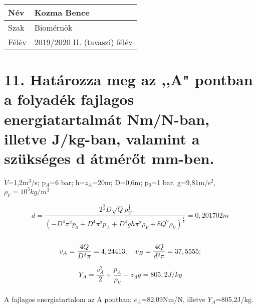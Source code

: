 \begin{tabular}{ | p{2cm} | p{14cm} | } 
	\hline
	Név & Kozma Bence \\ 
	\hline
	Szak & Biomérnök \\ 
	\hline
	Félév & 2019/2020 II. (tavaszi) félév \\ 
	\hline
\end{tabular}
\section*{11. Határozza meg az ,,A" pontban a folyadék fajlagos energiatartalmát Nm/N-ban, illetve J/kg-ban, valamint a szükséges d átmérőt mm-ben.} 
$\dot{V}$=1,2m$^3$/s; p$_A$=6 bar; h=$z_A$=20m; D=0,6m; p$_0$=1 bar, g=9,81m/s$^2$, $\rho_V=10^3kg/m^3$

$$
d=\frac{2^{\frac{3}{4}}D\sqrt{Q}\rho_V^{\frac{1}{4}}}{(-D^4\pi^2p_0+D^4\pi^2p_A+D^4gh\pi^2\rho_V+8Q^2\rho_V)^{\frac{1}{3}}}=0,201702m
$$
\\
$$
v_A=\frac{4Q}{D^2\pi}=4,24413 ; \hspace*{10pt} v_B=\frac{4Q}{d^2\pi}=37,5555;
$$

$$
Y_A=\frac{v_A^2}{2}+\frac{p_A}{\rho_V}+z_Ag=805,2 J/kg
$$
\\
A fajlagos energiatartalom az A pontban: $e_A$=82,09Nm/N, illetve $Y_A$=805,2J/kg.